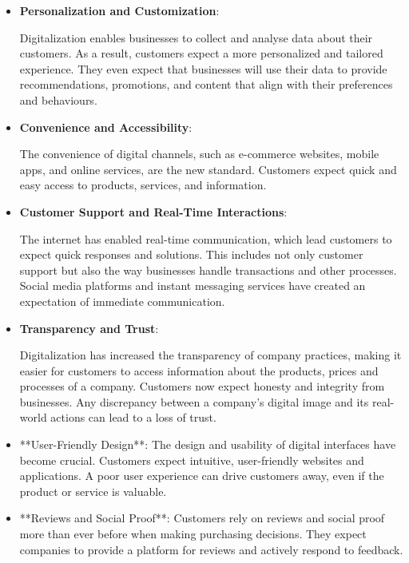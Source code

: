 \documentclass[a4]{scrartcl}
\begin{document}
\begin{itemize}
	\item \textbf{Personalization and Customization}: 
	
	Digitalization enables businesses to collect and analyse data about their customers. As a result, customers expect a more personalized and tailored experience. They even expect that businesses will use their data to provide recommendations, promotions, and content that align with their preferences and behaviours.~\cite{socialmedia, masterthesis, digitalmatrix, leadingdigital}
	
	
	\item \textbf{Convenience and Accessibility}: 
	
	The convenience of digital channels, such as e-commerce websites, mobile apps, and online services, are the new standard. Customers expect quick and easy access to products, services, and information.~\cite{masterthesis, leadingdigital}
	
	
	\item \textbf{Customer Support and Real-Time Interactions}: 
	
	The internet has enabled real-time communication, which lead customers to expect quick responses and solutions. This includes not only customer support but also the way businesses handle transactions and other processes. Social media platforms and instant messaging services have created an expectation of immediate communication.~\cite{socialmedia, digitalmatrix, leadingdigital}
	
	
	\item \textbf{Transparency and Trust}: 
	
	Digitalization has increased the transparency of company practices, making it easier for customers to access information about the products, prices and processes of a company. Customers now expect honesty and integrity from businesses. Any discrepancy between a company's digital image and its real-world actions can lead to a loss of trust.~\cite{trust}
	
	\item **User-Friendly Design**: The design and usability of digital interfaces have become crucial. Customers expect intuitive, user-friendly websites and applications. A poor user experience can drive customers away, even if the product or service is valuable.
	
	\item **Reviews and Social Proof**: Customers rely on reviews and social proof more than ever before when making purchasing decisions. They expect companies to provide a platform for reviews and actively respond to feedback.
	

\end{itemize}
\end{document}
